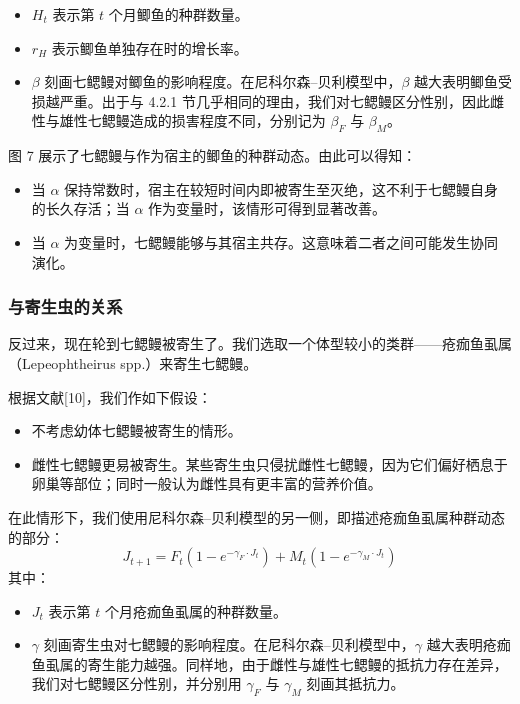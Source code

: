 \documentclass[11pt,a4paper]{ctexart}
\begin{document}
\begin{itemize}
\item $H_t$ 表示第 $t$ 个月鲫鱼的种群数量。
\item $r_H$ 表示鲫鱼单独存在时的增长率。
\item $\beta$ 刻画七鳃鳗对鲫鱼的影响程度。在尼科尔森–贝利模型中，$\beta$ 越大表明鲫鱼受损越严重。出于与 4.2.1 节几乎相同的理由，我们对七鳃鳗区分性别，因此雌性与雄性七鳃鳗造成的损害程度不同，分别记为 $\beta_F$ 与 $\beta_M$。
\end{itemize}

图 7 展示了七鳃鳗与作为宿主的鲫鱼的种群动态。由此可以得知：

\begin{itemize}
\item 当 $\alpha$ 保持常数时，宿主在较短时间内即被寄生至灭绝，这不利于七鳃鳗自身的长久存活；当 $\alpha$ 作为变量时，该情形可得到显著改善。
\item 当 $\alpha$ 为变量时，七鳃鳗能够与其宿主共存。这意味着二者之间可能发生协同演化。
\end{itemize}

\subsubsection{与寄生虫的关系}

反过来，现在轮到七鳃鳗被寄生了。我们选取一个体型较小的类群——疮痂鱼虱属（Lepeophtheirus spp.）来寄生七鳃鳗。

根据文献[10]，我们作如下假设：

\begin{itemize}
\item 不考虑幼体七鳃鳗被寄生的情形。
\item 雌性七鳃鳗更易被寄生。某些寄生虫只侵扰雌性七鳃鳗，因为它们偏好栖息于卵巢等部位；同时一般认为雌性具有更丰富的营养价值。
\end{itemize}

在此情形下，我们使用尼科尔森–贝利模型的另一侧，即描述疮痂鱼虱属种群动态的部分：
\begin{equation}
J_{t+1}=F_t\left(1-e^{-\gamma_F\cdot J_t}\right)+M_t\left(1-e^{-\gamma_M\cdot J_t}\right) \tag{12}
\end{equation}
其中：

\begin{itemize}
\item $J_t$ 表示第 $t$ 个月疮痂鱼虱属的种群数量。
\item $\gamma$ 刻画寄生虫对七鳃鳗的影响程度。在尼科尔森–贝利模型中，$\gamma$ 越大表明疮痂鱼虱属的寄生能力越强。同样地，由于雌性与雄性七鳃鳗的抵抗力存在差异，我们对七鳃鳗区分性别，并分别用 $\gamma_F$ 与 $\gamma_M$ 刻画其抵抗力。
\end{itemize}
\end{document}
